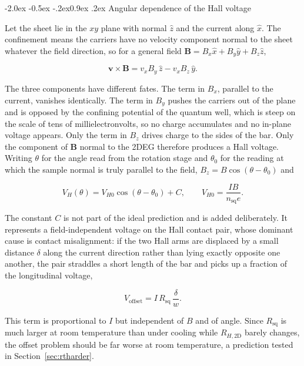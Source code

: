 \documentclass[11pt,a4paper]{article}
\makeatletter
\renewcommand\subsection{\@startsection{subsection}{2}{\z@}%
  {-2.0ex \@plus -0.5ex \@minus -.2ex}{0.9ex \@plus .2ex}%
  {\normalfont\normalsize\bfseries}}
\newcommand{\Rsq}{R_{\mathrm{sq}}}
\newcommand{\Rhtwod}{R_{H,\mathrm{2D}}}
\newcommand{\nsq}{n_{\mathrm{sq}}}
\makeatother
\begin{document}
\subsection{Angular dependence of the Hall voltage}
\label{sec:theoryangle}

Let the sheet lie in the $xy$ plane with normal $\hat{z}$ and the current along $\hat{x}$.
The confinement means the carriers have no velocity component normal to the sheet whatever
the field direction, so for a general field
$\mathbf{B} = B_x\hat{x}+B_y\hat{y}+B_z\hat{z}$,

\begin{equation}
\mathbf{v}\times\mathbf{B} = v_x B_y\,\hat{z} - v_x B_z\,\hat{y}.
\label{eq:angvector}
\end{equation}

The three components have different fates. The term in $B_x$, parallel to the current,
vanishes identically. The term in $B_y$ pushes the carriers out of the plane and is opposed
by the confining potential of the quantum well, which is steep on the scale of tens of
millielectronvolts, so no charge accumulates and no in-plane voltage appears. Only the term
in $B_z$ drives charge to the sides of the bar. Only the component of $\mathbf{B}$ normal to
the 2DEG therefore produces a Hall voltage. Writing $\theta$ for the angle read from the
rotation stage and $\theta_0$ for the reading at which the sample normal is truly parallel
to the field, $B_z = B\cos(\theta-\theta_0)$ and

\begin{equation}
V_H(\theta) = V_{H0}\cos(\theta - \theta_0) + C,
\qquad V_{H0} = \frac{IB}{\nsq e}.
\label{eq:angle}
\end{equation}

The constant $C$ is not part of the ideal prediction and is added deliberately. It
represents a field-independent voltage on the Hall contact pair, whose dominant cause is
contact misalignment: if the two Hall arms are displaced by a small distance $\delta$ along
the current direction rather than lying exactly opposite one another, the pair straddles a
short length of the bar and picks up a fraction of the longitudinal voltage,

\begin{equation}
V_{\mathrm{offset}} = I\,\Rsq\,\frac{\delta}{w}.
\label{eq:offset}
\end{equation}

This term is proportional to $I$ but independent of $B$ and of angle. Since $\Rsq$ is much
larger at room temperature than under cooling while $\Rhtwod$ barely changes, the offset
problem should be far worse at room temperature, a prediction tested in
Section~\ref{sec:rtharder}.
\end{document}
